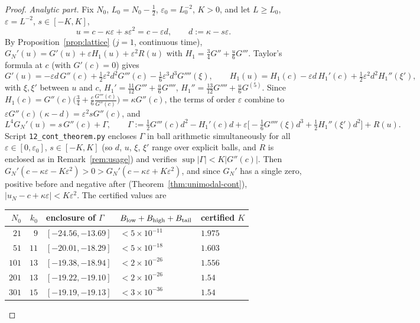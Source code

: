 \documentclass[11pt,a4paper]{article}
\theoremstyle{definition}
\theoremstyle{remark}
\begin{document}
\begin{proof}
\emph{Analytic part.} Fix $N_0$, $L_0=N_0-\frac12$, $\varepsilon_0=L_0^{-2}$, $K>0$, and let $L\ge L_0$,
$\varepsilon=L^{-2}$, $s\in[-K,K]$,
\[
  u=c-\kappa\varepsilon+s\varepsilon^2=c-\varepsilon d,\qquad d:=\kappa-s\varepsilon .
\]
By Proposition~\ref{prop:lattice} ($j=1$, continuous time), $G_N'(u)=G'(u)+\varepsilon H_1(u)+\varepsilon^2R(u)$ with
$H_1=\frac34G''+\frac u6G'''$. Taylor's formula at $c$ (with $G'(c)=0$) gives
\[
 G'(u)=-\varepsilon d\,G''(c)+\tfrac12\varepsilon^2d^2G'''(c)-\tfrac16\varepsilon^3d^3G''''(\xi),\qquad
 H_1(u)=H_1(c)-\varepsilon d\,H_1'(c)+\tfrac12\varepsilon^2d^2H_1''(\xi'),
\]
with $\xi,\xi'$ between $u$ and $c$, $H_1'=\frac{11}{12}G'''+\frac u6G''''$, $H_1''=\frac{13}{12}G''''+\frac u6G^{(5)}$.
Since $H_1(c)=G''(c)\bigl(\frac34+\frac c6\frac{G'''(c)}{G''(c)}\bigr)=\kappa G''(c)$, the terms of order
$\varepsilon$ combine to $\varepsilon G''(c)(\kappa-d)=\varepsilon^2sG''(c)$, and
\begin{equation}\label{eq:Gamma}
 L^4G_N'(u)=s\,G''(c)+\Gamma,\qquad
 \Gamma:=\tfrac12G'''(c)d^2-H_1'(c)d+\varepsilon\bigl[-\tfrac16G''''(\xi)d^3+\tfrac12H_1''(\xi')d^2\bigr]+R(u).
\end{equation}
Script \texttt{12\_cont\_theorem.py} encloses $\Gamma$ in ball arithmetic simultaneously for all
$\varepsilon\in[0,\varepsilon_0]$, $s\in[-K,K]$ (so $d$, $u$, $\xi$, $\xi'$ range over explicit balls, and $R$ is
enclosed as in Remark~\ref{rem:usage}) and verifies $\sup|\Gamma|<K|G''(c)|$. Then
$G_N'(c-\kappa\varepsilon-K\varepsilon^2)>0>G_N'(c-\kappa\varepsilon+K\varepsilon^2)$, and since $G_N'$ has a single
zero, positive before and negative after (Theorem~\ref{thm:unimodal-cont}), $|u_N-c+\kappa\varepsilon|<K\varepsilon^2$.
The certified values are
\begin{center}\small
\begin{tabular}{rrlll}
\toprule
$N_0$ & $k_0$ & enclosure of $\Gamma$ & $B_{\rm low}+B_{\rm high}+B_{\rm tail}$ & certified $K$\\
\midrule
$21$ & $9$ & $[-24.56,-13.69]$ & $<5\times10^{-11}$ & $1.975$\\
$51$ & $11$ & $[-20.01,-18.29]$ & $<5\times10^{-18}$ & $1.603$\\
$101$ & $13$ & $[-19.38,-18.94]$ & $<2\times10^{-26}$ & $1.556$\\
$201$ & $13$ & $[-19.22,-19.10]$ & $<2\times10^{-26}$ & $1.54$\\
$301$ & $15$ & $[-19.19,-19.13]$ & $<3\times10^{-36}$ & $1.54$\\

\end{tabular}
\end{center}
\end{proof}
\end{document}
